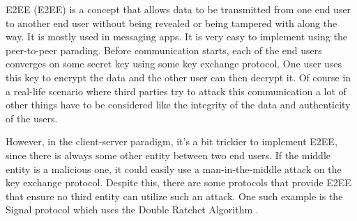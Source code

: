 E2EE (\acl{E2EE}) is a concept that allows data to be transmitted from one end user to another end user without being revealed or being tampered with along the way. It is mostly used in messaging apps. It is very easy to implement using the peer-to-peer parading. Before communication starts, each of the end users converges on some secret key using some key exchange protocol. One user uses this key to encrypt the data and the other user can then decrypt it. Of course in a real-life scenario where third parties try to attack this communication a lot of other things have to be considered like the integrity of the data and authenticity of the users.

However, in the client-server paradigm, it's a bit trickier to implement E2EE, since there is always some other entity between two end users. If the middle entity is a malicious one, it could easily use a man-in-the-middle attack on the key exchange protocol. Despite this, there are some protocols that provide E2EE that ensure no third entity can utilize such an attack. One such example is the Signal protocol which uses the Double Ratchet Algorithm \cite{Marlinspike2016}.
